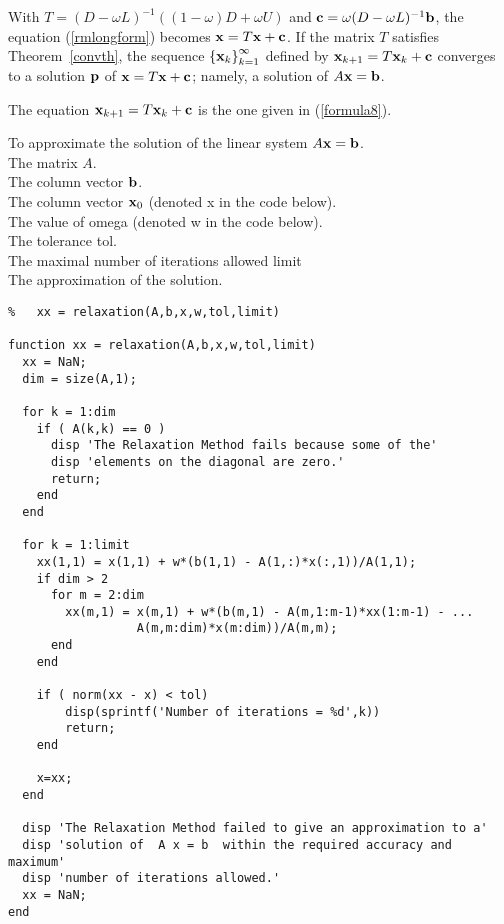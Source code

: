 With $T = (D-\omega L)^{-1}((1-\omega)D + \omega U)$ and
$\mathbf{c} = \omega (D-\omega L)^{-1}\mathbf{b}$, the equation
(\ref{rmlongform}) becomes $\mathbf{x} = T\mathbf{x} + \mathbf{c}$.  If the
matrix $T$ satisfies Theorem~\ref{convth}, the sequence
$\left\{\mathbf{x}_{k}\right\}_{k=1}^\infty$ defined by
$\mathbf{x}_{k+1} = T\mathbf{x}_k + \mathbf{c}$ converges to a solution
$\mathbf{p}$ of $\mathbf{x} = T\mathbf{x} + \mathbf{c}$; namely, a solution of
$A\mathbf{x} = \mathbf{b}$.

The equation $\mathbf{x}_{k+1} = T\mathbf{x}_k + \mathbf{c}$ is the one given in
(\ref{formula8}).

\begin{code}
To approximate the solution of the linear system $A \mathbf{x} = \mathbf{b}$.\\
 The matrix $A$.\\
The column vector $\mathbf{b}$.\\
The column vector $\mathbf{x}_0$ (denoted x in the code below).\\
The value of omega (denoted w in the code below).\\
The tolerance  tol.\\
The maximal number of iterations allowed  limit\\
 The approximation of the solution.
\small
\begin{verbatim}
%   xx = relaxation(A,b,x,w,tol,limit)

function xx = relaxation(A,b,x,w,tol,limit)
  xx = NaN;
  dim = size(A,1);

  for k = 1:dim
    if ( A(k,k) == 0 )
      disp 'The Relaxation Method fails because some of the'
      disp 'elements on the diagonal are zero.'
      return;
    end
  end

  for k = 1:limit
    xx(1,1) = x(1,1) + w*(b(1,1) - A(1,:)*x(:,1))/A(1,1);
    if dim > 2
      for m = 2:dim
        xx(m,1) = x(m,1) + w*(b(m,1) - A(m,1:m-1)*xx(1:m-1) - ...
                  A(m,m:dim)*x(m:dim))/A(m,m);
      end
    end

    if ( norm(xx - x) < tol)
        disp(sprintf('Number of iterations = %d',k))
        return;
    end
    
    x=xx;
  end

  disp 'The Relaxation Method failed to give an approximation to a'
  disp 'solution of  A x = b  within the required accuracy and maximum'
  disp 'number of iterations allowed.'
  xx = NaN;
end
\end{verbatim}
\end{code}

